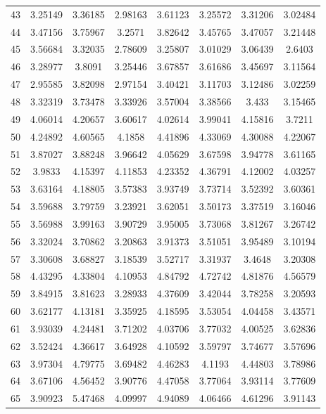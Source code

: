 \begin{center}
\begin{longtable}{cccccccc}
43 & 3.25149 & 3.36185 & 2.98163 & 3.61123 & 3.25572 & 3.31206 & 3.02484\\
44 & 3.47156 & 3.75967 & 3.2571 & 3.82642 & 3.45765 & 3.47057 & 3.21448\\
45 & 3.56684 & 3.32035 & 2.78609 & 3.25807 & 3.01029 & 3.06439 & 2.6403\\
46 & 3.28977 & 3.8091 & 3.25446 & 3.67857 & 3.61686 & 3.45697 & 3.11564\\
47 & 2.95585 & 3.82098 & 2.97154 & 3.40421 & 3.11703 & 3.12486 & 3.02259\\
48 & 3.32319 & 3.73478 & 3.33926 & 3.57004 & 3.38566 & 3.433 & 3.15465\\
49 & 4.06014 & 4.20657 & 3.60617 & 4.02614 & 3.99041 & 4.15816 & 3.7211\\
50 & 4.24892 & 4.60565 & 4.1858 & 4.41896 & 4.33069 & 4.30088 & 4.22067\\
51 & 3.87027 & 3.88248 & 3.96642 & 4.05629 & 3.67598 & 3.94778 & 3.61165\\
52 & 3.9833 & 4.15397 & 4.11853 & 4.23352 & 4.36791 & 4.12002 & 4.03257\\
53 & 3.63164 & 4.18805 & 3.57383 & 3.93749 & 3.73714 & 3.52392 & 3.60361\\
54 & 3.59688 & 3.79759 & 3.23921 & 3.62051 & 3.50173 & 3.37519 & 3.16046\\
55 & 3.56988 & 3.99163 & 3.90729 & 3.95005 & 3.73068 & 3.81267 & 3.26742\\
56 & 3.32024 & 3.70862 & 3.20863 & 3.91373 & 3.51051 & 3.95489 & 3.10194\\
57 & 3.30608 & 3.68827 & 3.18539 & 3.52717 & 3.31937 & 3.4648 & 3.20308\\
58 & 4.43295 & 4.33804 & 4.10953 & 4.84792 & 4.72742 & 4.81876 & 4.56579\\
59 & 3.84915 & 3.81623 & 3.28933 & 4.37609 & 3.42044 & 3.78258 & 3.20593\\
60 & 3.62177 & 4.13181 & 3.35925 & 4.18595 & 3.53054 & 4.04458 & 3.43571\\
61 & 3.93039 & 4.24481 & 3.71202 & 4.03706 & 3.77032 & 4.00525 & 3.62836\\
62 & 3.52424 & 4.36617 & 3.64928 & 4.10592 & 3.59797 & 3.74677 & 3.57696\\
63 & 3.97304 & 4.79775 & 3.69482 & 4.46283 & 4.1193 & 4.44803 & 3.78986\\
64 & 3.67106 & 4.56452 & 3.90776 & 4.47058 & 3.77064 & 3.93114 & 3.77609\\
65 & 3.90923 & 5.47468 & 4.09997 & 4.94089 & 4.06466 & 4.61296 & 3.91143\\

\end{longtable}
\end{center}
